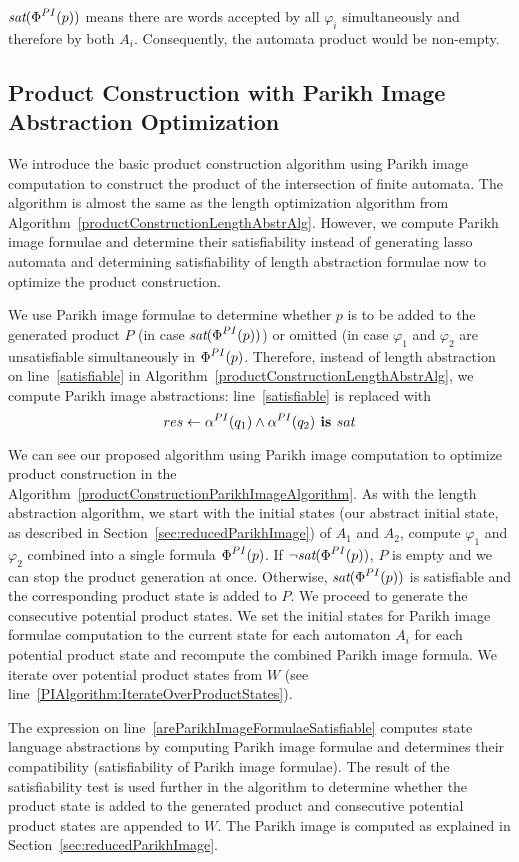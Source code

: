 $\emph{sat}(\emph{$\Phi$}^{PI}(p))$ means there are words accepted by all $\varphi_i$ simultaneously and therefore by both $A_i$. Consequently, the automata product would be non-empty.

\subsection{Product Construction with Parikh Image Abstraction Optimization}

We introduce the basic product construction algorithm using Parikh image computation to construct the product of the intersection of finite automata. The algorithm is almost the same as the length optimization algorithm from Algorithm~\ref{productConstructionLengthAbstrAlg}. However, we compute Parikh image formulae and determine their satisfiability instead of generating lasso automata and determining satisfiability of length abstraction formulae now to optimize the product construction.

We use Parikh image formulae to determine whether $p$ is to be added to the generated product $P$ (in case $\emph{sat}(\emph{$\Phi$}^{PI}(p))$) or omitted (in case $\varphi_1$ and $\varphi_2$ are unsatisfiable simultaneously in $\emph{$\Phi$}^{PI}(p)$. Therefore, instead of length abstraction on line~\ref{satisfiable} in Algorithm~\ref{productConstructionLengthAbstrAlg}, we compute Parikh image abstractions: line~\ref{satisfiable}  is replaced with
\[
    res \gets \alpha^{PI}(q_1) \land \alpha^{PI}(q_2) \textbf{ is } sat
\]

We can see our proposed algorithm using Parikh image computation to optimize product construction in the Algorithm~\ref{productConstructionParikhImageAlgorithm}. As with the length abstraction algorithm, we start with the initial states (our abstract initial state, as described in Section~\ref{sec:reducedParikhImage}) of $A_1$ and $A_2$, compute $\varphi_1$ and $\varphi_2$ combined into a single formula $\emph{$\Phi$}^{PI}(p)$. If $\neg \emph{sat}(\emph{$\Phi$}^{PI}(p))$, $P$ is empty and we can stop the product generation at once. Otherwise, $\emph{sat}(\emph{$\Phi$}^{PI}(p))$ is satisfiable and the corresponding product state is added to $P$. We proceed to generate the consecutive potential product states. We set the initial states for Parikh image formulae computation to the current state for each automaton $A_i$ for each potential product state and recompute the combined Parikh image formula. We iterate over potential product states from $W$ (see line~\ref{PIAlgorithm:IterateOverProductStates}).

The expression on line~\ref{areParikhImageFormulaeSatisfiable} computes state language abstractions by computing Parikh image formulae and determines their compatibility (satisfiability of Parikh image formulae). The result of the satisfiability test is used further in the algorithm to determine whether the product state is added to the generated product and consecutive potential product states are appended to $W$. The Parikh image is computed as explained in Section~\ref{sec:reducedParikhImage}.

